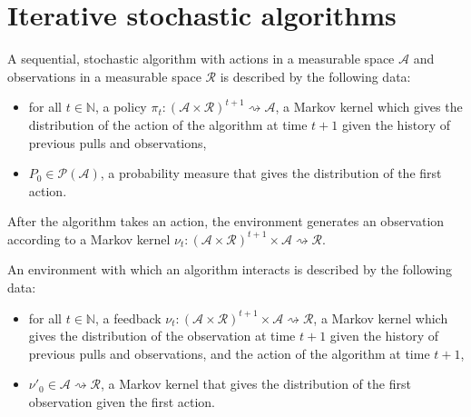 \chapter{Iterative stochastic algorithms}


\begin{definition}[Algorithm]\label{def:algorithm}
  \leanok
A sequential, stochastic algorithm with actions in a measurable space $\mathcal{A}$ and observations in a measurable space $\mathcal{R}$ is described by the following data:
\begin{itemize}
  \item for all $t \in \mathbb{N}$, a policy $\pi_t : (\mathcal{A} \times \mathcal{R})^{t+1} \rightsquigarrow \mathcal{A}$, a Markov kernel which gives the distribution of the action of the algorithm at time $t+1$ given the history of previous pulls and observations,
  \item $P_0 \in \mathcal{P}(\mathcal{A})$, a probability measure that gives the distribution of the first action.
\end{itemize}
\end{definition}

After the algorithm takes an action, the environment generates an observation according to a Markov kernel $\nu_t : (\mathcal{A} \times \mathcal{R})^{t+1} \times \mathcal{A} \rightsquigarrow \mathcal{R}$.

\begin{definition}[Environment]\label{def:environment}
  \leanok
An environment with which an algorithm interacts is described by the following data:
\begin{itemize}
  \item for all $t \in \mathbb{N}$, a feedback $\nu_t : (\mathcal{A} \times \mathcal{R})^{t+1} \times \mathcal{A} \rightsquigarrow \mathcal{R}$, a Markov kernel which gives the distribution of the observation at time $t+1$ given the history of previous pulls and observations, and the action of the algorithm at time $t+1$,
  \item $\nu'_0 \in \mathcal{A} \rightsquigarrow \mathcal{R}$, a Markov kernel that gives the distribution of the first observation given the first action.
\end{itemize}
\end{definition}

